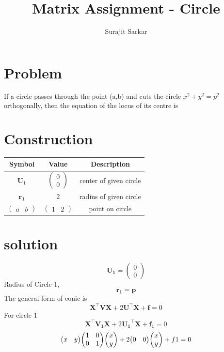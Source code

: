 \documentclass[journal,12pt,twocolumn]{IEEEtran}
\title{\mytitle}
\title
{
Matrix Assignment - Circle
}
\author{Surajit Sarkar}
\newcommand{\myvec}[1]{\ensuremath{\begin{pmatrix}#1\end{pmatrix}}}
\let\vec\mathbf
\begin{document}
\maketitle
\tableofcontents
\bigskip


\section{\textbf{Problem}}
If a circle passes through the point (a,b) and cuts the circle $x^2+y^2=p^2$ orthogonally, then the equation of the locus of its centre is 


\section{\textbf{Construction}}
 \begin{tabular}{|c|c|c|}
    \hline
    \textbf{Symbol}&\textbf{Value}&\textbf{Description}\\
	\hline
	$\vec{U_1}$ & ${\myvec{0 \\ 0}} $ & center of given circle\\
	\hline
	$\vec{r_1}$ & 2 & radius of given circle\\ \hline
	${\myvec{a & b}} $ & ${\myvec{1 & 2}} $ & point on circle \\ \hline
 \end{tabular}
\section{\textbf{solution}}

\begin{equation}
       \vec{U_1} = {\myvec{0\\0}}
\end{equation} 
Radius of Circle-1,
\begin{equation}
    \vec{r_1=p}
\end{equation}
The general form of conic is
\begin{equation}
    \vec{X}^{\top}\vec{V}\vec{X}+2\vec{U}^{\top}\vec{X}+\vec{f}=0
\end{equation}
For circle 1  \\
\begin{equation}
    \vec{X}^{\top}\vec{V_1}\vec{X}+2\vec{U_1}^{\top}\vec{X}+\vec{f_1}=0
\end{equation}
\begin{equation}
    {\myvec{x & y}} 
    {\myvec{1 & 0\\ 0 & 1 \\}}
    {\myvec{x \\ y}} +2
    {\myvec{0 & 0}} 
    {\myvec{x \\ y}} +f1=0 \\
\end{equation}
\end{document}
